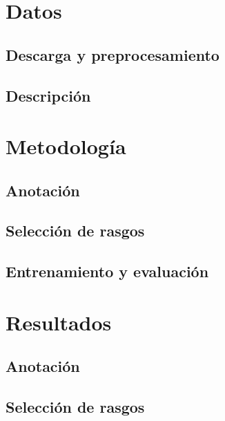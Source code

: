\documentclass[colorinlistoftodos]{article}
\begin{document}
\section{Datos}\label{section-data}

\subsection{Descarga y preprocesamiento}\label{subsection-data-preprocessing}


\subsection{Descripci\'on}\label{subsection-data-description}



\section{Metodolog\'ia}\label{section-methods}

\subsection{Anotaci\'on}\label{subsection-methods-annotation}


\subsection{Selecci\'on de rasgos}\label{subsection-methods-features}


\subsection{Entrenamiento y evaluaci\'on}\label{subsection-methods-models}


\section{Resultados}\label{section-results}

\subsection{Anotaci\'on}\label{subsec-results-annotation}


\subsection{Selecci\'on de rasgos}\label{subsection-results-features}

\end{document}
